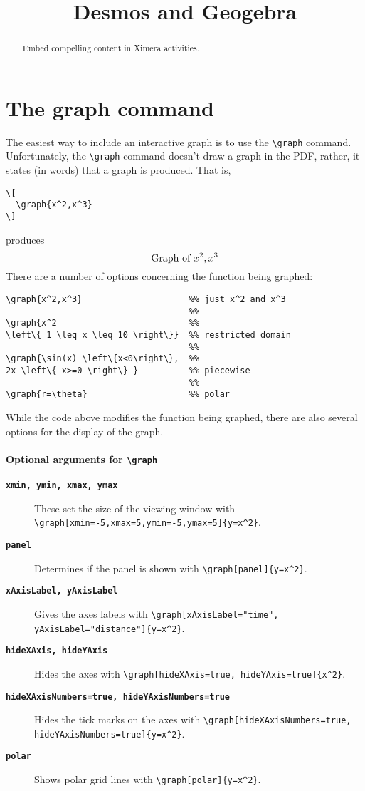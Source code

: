 \documentclass{ximera}
\title{Desmos and Geogebra}
\begin{document}
\begin{abstract}
  Embed compelling content in Ximera activities.
\end{abstract}
\maketitle

\section{The graph command}

The easiest way to include an interactive graph is to use the
\verb|\graph| command. Unfortunately, the \verb|\graph| command
doesn't draw a graph in the PDF, rather, it states (in words) that a
graph is produced. That is,
\begin{verbatim}
\[
  \graph{x^2,x^3}
\]
\end{verbatim}
produces
\[
  \text{Graph of $x^2,x^3$}
\]
There are a number of options concerning the function being graphed:
\begin{verbatim}
\graph{x^2,x^3}                     %% just x^2 and x^3
                                    %%
\graph{x^2                          %%
\left\{ 1 \leq x \leq 10 \right\}}  %% restricted domain
                                    %%
\graph{\sin(x) \left\{x<0\right\},  %%
2x \left\{ x>=0 \right\} }          %% piecewise
                                    %%
\graph{r=\theta}                    %% polar 
\end{verbatim}
While the code above modifies the function being graphed, there are also several options for the display of the graph.

\paragraph{Optional arguments for \texttt{\textbackslash graph}}

\begin{description}
  \item[\tt\bfseries xmin, ymin, xmax, ymax] These set the
    size of the viewing window with
    \verb|\graph[xmin=-5,xmax=5,ymin=-5,ymax=5]{y=x^2}|.
  \item[\tt\bfseries panel] Determines if the panel is shown with
    \verb|\graph[panel]{y=x^2}|.
  \item[\tt\bfseries xAxisLabel, yAxisLabel] Gives the axes labels with
    \verb|\graph[xAxisLabel="time", yAxisLabel="distance"]{y=x^2}|.
  \item[\tt\bfseries hideXAxis, hideYAxis] Hides the axes with
    \verb|\graph[hideXAxis=true, hideYAxis=true]{x^2}|.
  \item[\tt\bfseries hideXAxisNumbers=true, hideYAxisNumbers=true] Hides the tick marks on
    the axes with
    \verb|\graph[hideXAxisNumbers=true, hideYAxisNumbers=true]{y=x^2}|.
  \item[\tt\bfseries polar] Shows polar grid lines with \verb|\graph[polar]{y=x^2}|.
\end{description}
\end{document}
